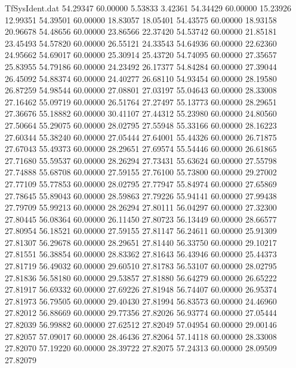 \begin{filecontents}{TfSysIdent.dat}
  54.29347   60.00000    5.53833    3.42361
  54.34429   60.00000   15.23926   12.99351
  54.39501   60.00000   18.83057   18.05401
  54.43575   60.00000   18.93158   20.96678
  54.48656   60.00000   23.86566   22.37420
  54.53742   60.00000   21.85181   23.45493
  54.57820   60.00000   26.55121   24.33543
  54.64936   60.00000   22.62360   24.95662
  54.69017   60.00000   25.30914   25.43720
  54.74095   60.00000   27.35657   25.83955
  54.79186   60.00000   24.23492   26.17377
  54.84284   60.00000   27.39044   26.45092
  54.88374   60.00000   24.40277   26.68110
  54.93454   60.00000   28.19580   26.87259
  54.98544   60.00000   27.08801   27.03197
  55.04643   60.00000   28.33008   27.16462
  55.09719   60.00000   26.51764   27.27497
  55.13773   60.00000   28.29651   27.36676
  55.18882   60.00000   30.41107   27.44312
  55.23980   60.00000   24.80560   27.50664
  55.29075   60.00000   28.02795   27.55948
  55.33166   60.00000   28.16223   27.60344
  55.38240   60.00000   27.05444   27.64001
  55.44326   60.00000   26.71875   27.67043
  55.49373   60.00000   28.29651   27.69574
  55.54446   60.00000   26.61865   27.71680
  55.59537   60.00000   28.26294   27.73431
  55.63624   60.00000   27.55798   27.74888
  55.68708   60.00000   27.59155   27.76100
  55.73800   60.00000   29.27002   27.77109
  55.77853   60.00000   28.02795   27.77947
  55.84974   60.00000   27.65869   27.78645
  55.89043   60.00000   28.59863   27.79226
  55.94141   60.00000   27.99438   27.79709
  55.99213   60.00000   28.26294   27.80111
  56.04297   60.00000   27.32300   27.80445
  56.08364   60.00000   26.11450   27.80723
  56.13449   60.00000   28.66577   27.80954
  56.18521   60.00000   27.59155   27.81147
  56.24611   60.00000   25.91309   27.81307
  56.29678   60.00000   28.29651   27.81440
  56.33750   60.00000   29.10217   27.81551
  56.38854   60.00000   28.83362   27.81643
  56.43946   60.00000   25.44373   27.81719
  56.49032   60.00000   29.60510   27.81783
  56.53107   60.00000   28.02795   27.81836
  56.58180   60.00000   29.53857   27.81880
  56.64279   60.00000   26.65222   27.81917
  56.69332   60.00000   27.69226   27.81948
  56.74407   60.00000   26.95374   27.81973
  56.79505   60.00000   29.40430   27.81994
  56.83573   60.00000   24.46960   27.82012
  56.88669   60.00000   29.77356   27.82026
  56.93774   60.00000   27.05444   27.82039
  56.99882   60.00000   27.62512   27.82049
  57.04954   60.00000   29.00146   27.82057
  57.09017   60.00000   28.46436   27.82064
  57.14118   60.00000   28.33008   27.82070
  57.19220   60.00000   28.39722   27.82075
  57.24313   60.00000   28.09509   27.82079

\end{filecontents}
